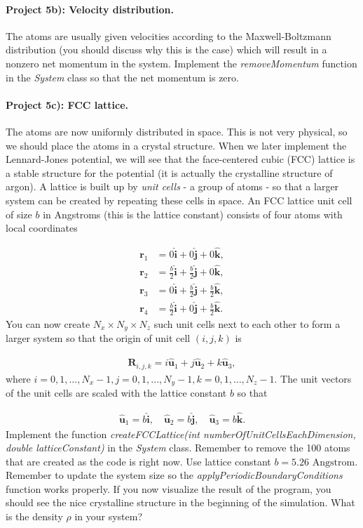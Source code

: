 \documentclass[%
oneside,                 %
final,                   %
10pt]{article}
\begin{document}
\paragraph{Project 5b): Velocity distribution.}
The atoms are usually given velocities according to the Maxwell-Boltzmann distribution (you should discuss why this is the case) which will result in a nonzero net momentum in the system. Implement the \emph{removeMomentum} function in the \emph{System} class so that the net momentum is zero.

\paragraph{Project 5c): FCC lattice.}
The atoms are now uniformly distributed in space. This is not very physical, so we should place the atoms in a crystal structure. When we later implement the Lennard-Jones potential, we will see that the face-centered cubic (FCC) lattice is a stable structure for the potential (it is actually the crystalline structure of argon). A lattice is built up by \emph{unit cells} - a group of atoms - so that a larger system can be created by repeating these cells in space. An FCC lattice unit cell of size $b$ in Angstroms (this is the lattice constant) consists of four atoms with local coordinates

\begin{align}
	\mathbf{r}_1 &= 0 \hat{\mathbf{i}} + 0 \hat{\mathbf{j}} + 0 \hat{\mathbf{k}},\\
	\mathbf{r}_2 &= \frac{b}{2} \hat{\mathbf{i}} + \frac{b}{2} \hat{\mathbf{j}} + 0 \hat{\mathbf{k}},\\
	\mathbf{r}_3 &= 0 \hat{\mathbf{i}} + \frac{b}{2} \hat{\mathbf{j}} + \frac{b}{2} \hat{\mathbf{k}},\\
	\mathbf{r}_4 &= \frac{b}{2} \hat{\mathbf{i}} + 0 \hat{\mathbf{j}} + \frac{b}{2} \hat{\mathbf{k}}.
\end{align}
You can now create $N_x \times N_y \times N_z$ such unit cells next to each other to form a larger system so that the origin of unit cell $(i,j,k)$ is

\begin{align}
	\mathbf{R}_{i,j,k} = i \hat{\mathbf{u}}_1 + j \hat{\mathbf{u}}_2 + k \hat{\mathbf{u}}_3,
\end{align}
where $i=0,1,..., N_x-1, j=0,1,..., N_y-1, k=0,1,..., N_z-1$. The unit vectors of the unit cells are scaled with the lattice constant $b$ so that

\begin{align}
	\hat{\mathbf{u}}_1 = b\hat{\mathbf{i}}, \quad \hat{\mathbf{u}}_2 = b\hat{\mathbf{j}}, \quad \hat{\mathbf{u}}_3 = b\hat{\mathbf{k}}.
\end{align}
Implement the function \emph{createFCCLattice(int numberOfUnitCellsEachDimension, double latticeConstant)} in the \emph{System} class. Remember to remove the 100 atoms that are created as the code is right now. Use lattice constant $b=5.26$ $\mathrm{Angstrom}$. Remember to update the system size so the \emph{applyPeriodicBoundaryConditions} function works properly. If you now visualize the result of the program, you should see the nice crystalline structure in the beginning of the simulation. What is the density $\rho$ in your system?
\end{document}
